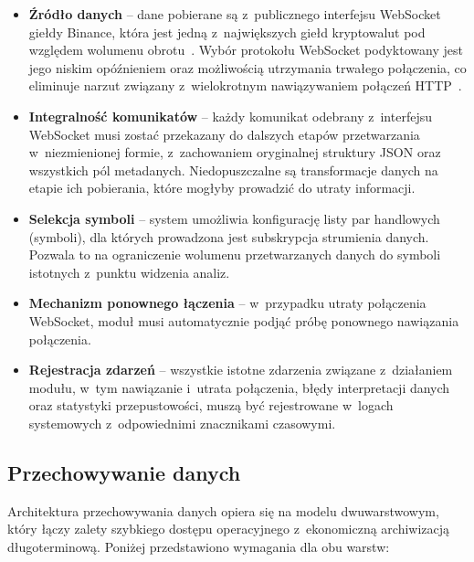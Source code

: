 \begin{itemize}
    \item \textbf{Źródło danych} -- dane pobierane są z~publicznego interfejsu WebSocket giełdy Binance, która jest
    jedną z~największych giełd kryptowalut pod względem wolumenu obrotu~\cite{coingecko_exchange_report}.
    Wybór protokołu WebSocket podyktowany jest jego niskim opóźnieniem oraz możliwością utrzymania trwałego połączenia,
    co eliminuje narzut związany z~wielokrotnym nawiązywaniem połączeń HTTP\@~\cite{wesocket_http_performance}.
    \item \textbf{Integralność komunikatów} -- każdy komunikat odebrany z~interfejsu WebSocket musi zostać przekazany
    do dalszych etapów przetwarzania w~niezmienionej formie, z~zachowaniem oryginalnej struktury JSON oraz wszystkich
    pól metadanych.
    Niedopuszczalne są transformacje danych na etapie ich pobierania, które mogłyby prowadzić do utraty informacji.
    \item \textbf{Selekcja symboli} -- system umożliwia konfigurację listy par handlowych (symboli), dla których
    prowadzona jest subskrypcja strumienia danych.
    Pozwala to na ograniczenie wolumenu przetwarzanych danych do symboli istotnych z~punktu widzenia analiz.
    \item \textbf{Mechanizm ponownego łączenia} -- w~przypadku utraty połączenia WebSocket, moduł musi automatycznie
    podjąć próbę ponownego nawiązania połączenia.
    \item \textbf{Rejestracja zdarzeń} -- wszystkie istotne zdarzenia związane z~działaniem modułu, w~tym nawiązanie
    i~utrata połączenia, błędy interpretacji danych oraz statystyki przepustowości, muszą być rejestrowane w~logach systemowych
    z~odpowiednimi znacznikami czasowymi.
\end{itemize}

\subsection{Przechowywanie danych}
\label{subsec:przechowywanie_danych}

Architektura przechowywania danych opiera się na modelu dwuwarstwowym, który łączy zalety szybkiego dostępu
operacyjnego z~ekonomiczną archiwizacją długoterminową.
Poniżej przedstawiono wymagania dla obu warstw:

